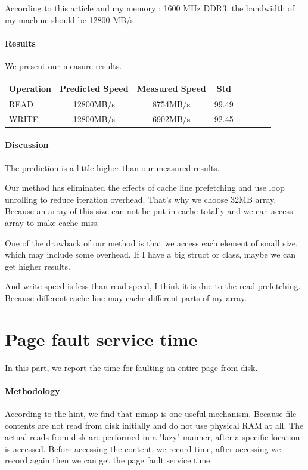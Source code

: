 According to this article and my memory : 1600 MHz DDR3. the bandwidth of my machine should be 12800 MB/s. 

\paragraph{Results}
We present our measure results.

\begin{center}
\begin{tabular}{l*{6}{c}r}
Operation             & Predicted Speed & Measured Speed & Std \\
\hline
READ & 12800MB/s & 8754MB/s & 99.49 \\
WRITE & 12800MB/s & 6902MB/s & 92.45\\

\end{tabular}
\end{center}

\paragraph{Discussion}
The prediction is a little higher than our measured results. 

Our method has eliminated the effects of cache line prefetching and use loop unrolling to reduce iteration overhead. That's why we choose 32MB array. Because an array of this size can not be put in cache totally and we can access array to make cache miss.

One of the drawback of our method is that we access each element of small size, which may include some overhead. If I have a big struct or class, maybe we can get higher results. 

And write speed is less than read speed, I think it is due to the read prefetching. Because different cache line may cache different parts of my array.

\section{Page fault service time}
In this part, we report the time for faulting an entire page from disk.

\paragraph{Methodology}
According to the hint, we find that mmap is one useful mechanism. Because file contents are not read from disk initially and do not use physical RAM at all. The actual reads from disk are performed in a "lazy" manner, after a specific location is accessed. Before accessing the content, we record time, after accessing we record again then we can get the page fault service time.

